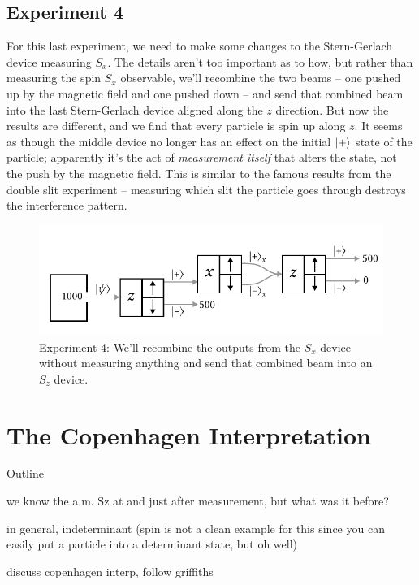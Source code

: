 \subsection{Experiment 4}

For this last experiment, we need to make some changes to the Stern-Gerlach device measuring $S_x$.  The details aren't too important as to how, but rather than measuring the spin $S_x$ observable, we'll recombine the two beams -- one pushed up by the magnetic field and one pushed down -- and send that combined beam into the last Stern-Gerlach device aligned along the $z$ direction.  But now the results are different, and we find that every particle is spin up along $z$.  It seems as though the middle device no longer has an effect on the initial $| + \rangle$ state of the particle; apparently it's the act of \emph{measurement itself} that alters the state, not the push by the magnetic field.  This is similar to the famous results from the double slit experiment -- measuring which slit the particle goes through destroys the interference pattern.

\begin{figure}
\centering\includegraphics[width=\linewidth]{Figures/Chapter 1/fig_sg_4.pdf}
\caption{Experiment 4: We'll recombine the outputs from the $S_x$ device without measuring anything and send that combined beam into an $S_z$ device. }
\label{fig_sg_4}
\end{figure}


%
%
%

\section{The Copenhagen Interpretation}

Outline

we know the a.m. Sz at and just after measurement, but what was it before?  

in general, indeterminant (spin is not a clean example for this since you can easily put a particle into a determinant state, but oh well)

discuss copenhagen interp, follow griffiths


